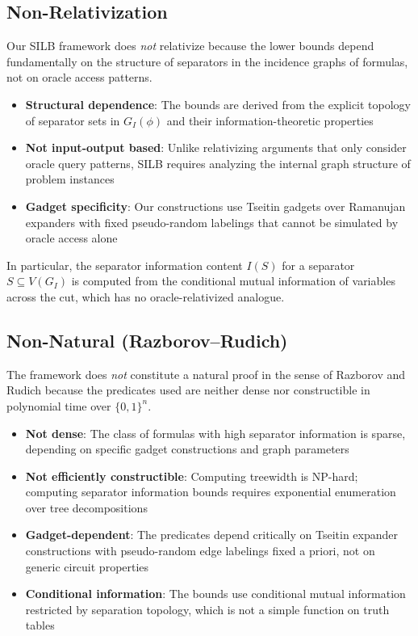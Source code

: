 \documentclass[11pt]{article}
\begin{document}
\subsection{Non-Relativization}

Our SILB framework does \emph{not} relativize because the lower bounds depend fundamentally on the structure of separators in the incidence graphs of formulas, not on oracle access patterns.

\begin{itemize}
\item \textbf{Structural dependence}: The bounds are derived from the explicit topology of separator sets in $G_I(\phi)$ and their information-theoretic properties
\item \textbf{Not input-output based}: Unlike relativizing arguments that only consider oracle query patterns, SILB requires analyzing the internal graph structure of problem instances
\item \textbf{Gadget specificity}: Our constructions use Tseitin gadgets over Ramanujan expanders with fixed pseudo-random labelings that cannot be simulated by oracle access alone
\end{itemize}

In particular, the separator information content $I(S)$ for a separator $S \subseteq V(G_I)$ is computed from the conditional mutual information of variables across the cut, which has no oracle-relativized analogue.

\subsection{Non-Natural (Razborov--Rudich)}

The framework does \emph{not} constitute a natural proof in the sense of Razborov and Rudich because the predicates used are neither dense nor constructible in polynomial time over $\{0,1\}^n$.

\begin{itemize}
\item \textbf{Not dense}: The class of formulas with high separator information is sparse, depending on specific gadget constructions and graph parameters
\item \textbf{Not efficiently constructible}: Computing treewidth is NP-hard; computing separator information bounds requires exponential enumeration over tree decompositions
\item \textbf{Gadget-dependent}: The predicates depend critically on Tseitin expander constructions with pseudo-random edge labelings fixed a priori, not on generic circuit properties
\item \textbf{Conditional information}: The bounds use conditional mutual information restricted by separation topology, which is not a simple function on truth tables
\end{itemize}
\end{document}
